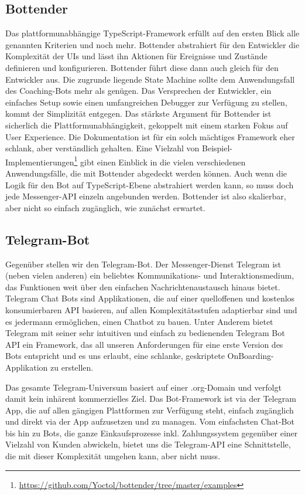     \subsection{Bottender}
        Das plattformunabhängige TypeScript-Framework erfüllt auf den ersten Blick alle genannten Kriterien und noch mehr. 
        Bottender abstrahiert für den Entwickler die Komplexität der UIs und lässt ihn Aktionen für Ereignisse und Zustände definieren und konfigurieren. Bottender führt diese dann auch gleich für den Entwickler aus. Die zugrunde liegende State Machine sollte dem Anwendungsfall des Coaching-Bots mehr als genügen. Das Versprechen der Entwickler, ein einfaches Setup sowie einen umfangreichen Debugger zur Verfügung zu stellen, kommt der Simplizität entgegen. Das stärkste Argument für Bottender ist sicherlich die Plattformunabhängigkeit, gekoppelt mit einem starken Fokus auf User Experience. Die Dokumentation ist für ein solch mächtiges Framework eher schlank, aber verständlich gehalten. Eine Vielzahl von Beispiel-Implementierungen\footnote{\url{https://github.com/Yoctol/bottender/tree/master/examples}} gibt einen Einblick in die vielen verschiedenen Anwendungsfälle, die mit Bottender abgedeckt werden können. Auch wenn die Logik für den Bot auf TypeScript-Ebene abstrahiert werden kann, so muss doch jede Messenger-API einzeln angebunden werden. Bottender ist also skalierbar, aber nicht so einfach zugänglich, wie zunächst erwartet.


    \subsection{Telegram-Bot}
        Gegenüber stellen wir den Telegram-Bot. Der Messenger-Dienst Telegram ist (neben vielen anderen) ein beliebtes Kommunikations- und Interaktionsmedium, das Funktionen weit über den einfachen Nachrichtenaustausch hinaus bietet. Telegram Chat Bots sind Applikationen, die auf einer quelloffenen und kostenlos konsumierbaren API \cite{telegramAPI} basieren, auf allen Komplexitätsstufen adaptierbar sind und es jedermann ermöglichen, einen Chatbot zu bauen. Unter Anderem bietet Telegram mit seiner sehr intuitiven und einfach zu bedienenden Telegram Bot API ein Framework, das all unseren Anforderungen für eine erste Version des Bots entspricht und es uns erlaubt, eine schlanke, geskriptete OnBoarding-Applikation zu erstellen. 
        
        Das gesamte Telegram-Universum basiert auf einer .org-Domain und verfolgt damit kein inhärent kommerzielles Ziel. Das Bot-Framework ist via der Telegram App, die auf allen gängigen Plattformen zur Verfügung steht, einfach zugänglich und direkt via der App aufzusetzen und zu managen. Vom einfachsten Chat-Bot bis hin zu Bots, die ganze Einkaufsprozesse inkl. Zahlungssystem gegenüber einer Vielzahl von Kunden abwickeln, bietet uns die Telegram-API eine Schnittstelle, die mit dieser Komplexität umgehen kann, aber nicht muss. 
        
